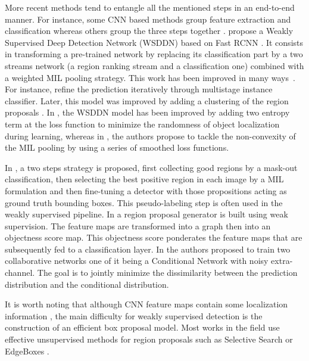 \documentclass[preprint]{elsarticle}
\begin{document}
More recent methods tend to entangle all the mentioned steps in an end-to-end manner. For instance, some CNN based methods group feature extraction and classification \citep{bilen_weakly_2016,diba_weakly_2017,kantorov_contextlocnet_2016,tang_multiple_2017} whereas others group the three steps together \citep{zhu_soft_2017}. \cite{bilen_weakly_2016} propose a Weakly Supervised Deep Detection Network (WSDDN)  based on Fast RCNN \citep{girshick_fast_2015}. It consists in transforming a pre-trained network by replacing its classification part by a two streams network (a region ranking stream and a classification one) combined with a weighted MIL pooling strategy. 
 This work has been improved in many ways~\citep{wan_minentropy_2018,kantorov_contextlocnet_2016,zhang_zigzag_2018,zhang_w2f_2018,dong_dualnetwork_2017,wan_cmil_2019}. For instance, \cite{tang_weakly_2017} refine the prediction iteratively through multistage instance classifier. Later, this model was improved by adding a clustering of the region proposals \citep{tang_weakly_2018}. In \citep{wan_minentropy_2018}, the WSDDN model has been improved by adding two entropy term at the loss function to minimize the randomness of  object localization during learning, whereas in \cite{wan_cmil_2019}, the authors propose to tackle the non-convexity of the MIL pooling by using a series of smoothed loss functions. 

 
In \citep{li_weakly_2016}, a two steps strategy is proposed, first collecting good regions by a mask-out classification, then selecting the best positive region in each image by a MIL formulation and then fine-tuning a detector with those propositions acting as ground truth bounding boxes. This pseudo-labeling step is often used in the weakly supervised pipeline. In \citep{zhu_soft_2017} a region proposal generator is built using weak supervision. The feature maps are transformed into a graph then into an objectness score map. This objectness score ponderates the feature maps that are subsequently fed to a classification layer. In \citep{arun_dissimilarity_2019} the authors proposed to train two collaborative networks one of it being a Conditional Network with noisy extra-channel. The goal is to jointly minimize the dissimilarity between the prediction distribution and the conditional distribution.


It is worth noting that although CNN feature maps contain some localization information \citep{oquab_is_2015}, the main difficulty for weakly supervised detection is the construction of an efficient box proposal model. Most works in the field use effective unsupervised methods for region proposals such as Selective Search \citep{uijlings_selective_2013} or EdgeBoxes \citep{zitnick_edge_2014}.
\end{document}
